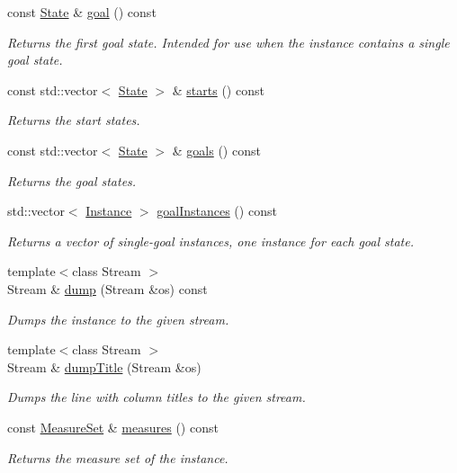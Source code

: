 \begin{DoxyCompactItemize}
const \hyperlink{structslb_1_1core_1_1sb_1_1Instance_a631205b5ee8d1a61a05c0d30f766ef2e}{State} \& \hyperlink{structslb_1_1core_1_1sb_1_1Instance_a8bb2fb56eff2e609fd7929449b141f8d}{goal} () const 
\begin{DoxyCompactList}\small\item\em Returns the first goal state. Intended for use when the instance contains a single goal state. \end{DoxyCompactList}\item 
const std\+::vector$<$ \hyperlink{structslb_1_1core_1_1sb_1_1Instance_a631205b5ee8d1a61a05c0d30f766ef2e}{State} $>$ \& \hyperlink{structslb_1_1core_1_1sb_1_1Instance_a781f5edc3e5686550d8ac5737fcdc020}{starts} () const 
\begin{DoxyCompactList}\small\item\em Returns the start states. \end{DoxyCompactList}\item 
const std\+::vector$<$ \hyperlink{structslb_1_1core_1_1sb_1_1Instance_a631205b5ee8d1a61a05c0d30f766ef2e}{State} $>$ \& \hyperlink{structslb_1_1core_1_1sb_1_1Instance_a5aed2f037cbdb04b8a41a13105388f1e}{goals} () const 
\begin{DoxyCompactList}\small\item\em Returns the goal states. \end{DoxyCompactList}\item 
std\+::vector$<$ \hyperlink{structslb_1_1core_1_1sb_1_1Instance}{Instance} $>$ \hyperlink{structslb_1_1core_1_1sb_1_1Instance_a049e21f64e6fbec805db3732dd06e7b4}{goal\+Instances} () const 
\begin{DoxyCompactList}\small\item\em Returns a vector of single-\/goal instances, one instance for each goal state. \end{DoxyCompactList}\item 
{\footnotesize template$<$class Stream $>$ }\\Stream \& \hyperlink{structslb_1_1core_1_1sb_1_1Instance_a97f58fb3459fb7c4b5e5978ffb2276c6}{dump} (Stream \&os) const 
\begin{DoxyCompactList}\small\item\em Dumps the instance to the given stream. \end{DoxyCompactList}\item 
{\footnotesize template$<$class Stream $>$ }\\Stream \& \hyperlink{structslb_1_1core_1_1sb_1_1Instance_acc69fbc389b99e7c5a2dfe6357c45034}{dump\+Title} (Stream \&os)
\begin{DoxyCompactList}\small\item\em Dumps the line with column titles to the given stream. \end{DoxyCompactList}\item 
const \hyperlink{structslb_1_1core_1_1sb_1_1MeasureSet}{Measure\+Set} \& \hyperlink{structslb_1_1core_1_1sb_1_1Instance_ad2e01a665a65c711a952491cf1790d0f}{measures} () const 
\begin{DoxyCompactList}\small\item\em Returns the measure set of the instance. \end{DoxyCompactList}\end{DoxyCompactItemize}
